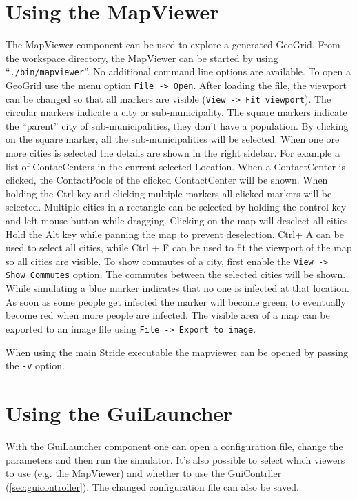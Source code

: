 \section{Using the MapViewer}

The MapViewer component can be used to explore a generated GeoGrid.
From the workspace directory, the MapViewer can be started by using \mbox{``\texttt{./bin/mapviewer}''}. No additional command line options are available.
To open a GeoGrid use the menu option \texttt{File -> Open}. After loading the file, the viewport can be changed so that all markers are visible (\texttt{View -> Fit viewport}).
The circular markers indicate a city or sub-municipality. The square markers indicate the ``parent'' city of sub-municipalities, they don't have a population.
By clicking on the square marker, all the sub-municipalities will be selected.
When one ore more cities is selected the details are shown in the right sidebar. For example a list of ContacCenters in the current selected Location. When a ContactCenter is clicked, the ContactPools of the clicked ContactCenter will be shown.
When holding the Ctrl key and clicking multiple markers all clicked markers will be selected.  Multiple cities in a rectangle can be selected by holding the control key and left mouse button while dragging. Clicking on the map will deselect all cities. Hold the Alt key while panning the map to prevent deselection.
Ctrl+ A can be used to select all cities, while Ctrl + F can be used to fit the viewport of the map so all cities are visible.
To show commutes of a city, first enable the \texttt{View -> Show Commutes} option. The commutes between the selected cities will be shown.
While simulating a blue marker indicates that no one is infected at that location. As soon as some people get infected the marker will become green, to eventually become red when more people are infected.
The visible area of a map can be exported to an image file using \texttt{File -> Export to image}.

When using the main Stride executable the mapviewer can be opened by passing the \texttt{-v} option.

\section{Using the GuiLauncher}

With the GuiLauncher component one can open a configuration file, change the parameters and then run the simulator. It's also possible to select which viewers to use (e.g. the MapViewer) and whether to use the GuiContrller (\ref{sec:guicontroller}). The changed configuration file can also be saved.

